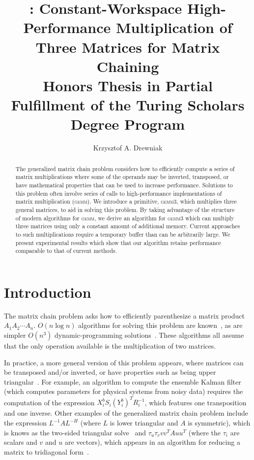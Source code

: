 \documentclass[12pt]{article}
\title{\gemmt{}: Constant-Workspace High-Performance Multiplication of Three Matrices for Matrix Chaining\\
{\large Honors Thesis in Partial Fulfillment of the Turing Scholars Degree Program}}
\author{Krzysztof A. Drewniak}
\newcommand*{\gemmt}{{\textsc{gemm3}}}
\newcommand*{\gemm}{{\textsc{gemm}}}
\newcommand*{\mycite}[1]{~\cite{#1}}
\begin{document}
\maketitle{}
\begin{abstract}
  The generalized matrix chain problem considers how to efficiently compute a series of matrix multiplications where some of the operands may be inverted, transposed, or have mathematical properties that can be used to increase performance.
  Solutions to this problem often involve series of calls to high-performance implementations of matrix multiplication (\gemm{}).
  We introduce a primitive, \gemmt{}, which multiplies three general matrices, to aid in solving this problem.
  By taking advantage of the structure of modern algorithms for \gemm{}, we derive an algorithm for \gemmt{} which can multiply three matrices using only a constant amount of additional memory.
  Current approaches to such multiplications require a temporary buffer than can be arbitrarily large.
  We present experimental results which show that our algorithm retains performance comparable to that of current methods.
\end{abstract}

\section{Introduction}
The matrix chain problem asks how to efficiently parenthesize a matrix product $A_1A_2\cdots A_n$.
$O(n \log n)$ algorithms for solving this problem are known\mycite{Hu1984}, as are simpler $O(n^3)$ dynamic-programming solutions\mycite{Barthels2018}.
These algorithms all assume that the only operation available is the multiplication of two matrices.

In practice, a more general version of this problem appears, where matrices can be transposed and/or inverted, or have properties such as being upper triangular\mycite{Barthels2018}.
For example, an algorithm to compute the ensemble Kalman filter\mycite{Rao2017} (which computes parameters for physical systems from noisy data) requires the computation of the expression $X_i^b S_i (Y_i^b)^T R_i^{-1}$, which features one transposition and one inverse.
Other examples of the generalized matrix chain problem include the expression $L^{-1}AL^{-H}$ (where $L$ is lower triangular and $A$ is symmetric), which is knows as the two-sided triangular solve\mycite{Poulson2011} and $\tau_u\tau_v vv^TAuu^T$ (where the $\tau_i$ are scalars and $v$ and $u$ are vectors), which appears in an algorithm for reducing a matrix to tridiagonal form\mycite{Choi1995}.
\end{document}

